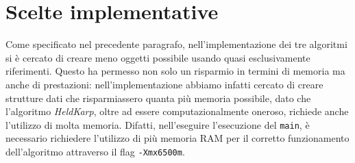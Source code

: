 \section{Scelte implementative}
Come specificato nel precedente paragrafo, nell'implementazione dei tre algoritmi si è cercato di creare meno oggetti possibile usando quasi esclusivamente riferimenti. Questo ha permesso non solo un risparmio in termini di memoria ma anche di prestazioni: nell'implementazione abbiamo infatti cercato di creare strutture dati che risparmiassero quanta più memoria possibile, dato che l'algoritmo \textit{HeldKarp}, oltre ad essere computazionalmente oneroso, richiede anche l'utilizzo di molta memoria. Difatti, nell'eseguire l'esecuzione del \texttt{main}, è necessario richiedere l'utilizzo di più memoria RAM per il corretto funzionamento dell'algoritmo attraverso il flag \texttt{-Xmx6500m}. 

